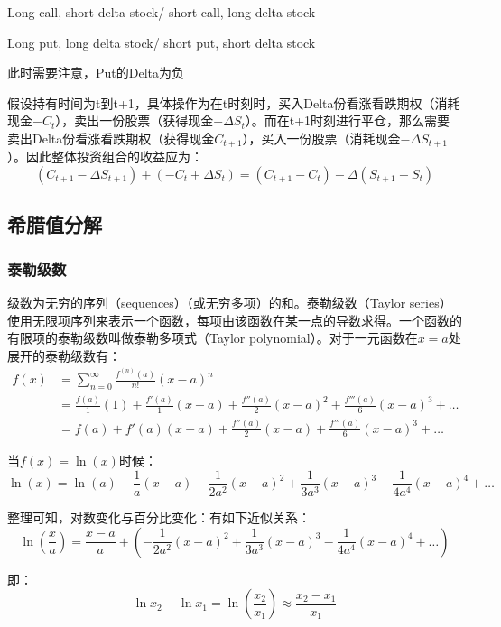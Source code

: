\documentclass[11pt]{article}
\begin{document}
Long call, short delta stock/ short call, long delta stock

Long put, long delta stock/ short put, short delta stock

此时需要注意，Put的Delta为负

假设持有时间为t到t+1，具体操作为在t时刻时，买入Delta份看涨看跌期权（消耗现金$-C_{t}$），卖出一份股票（获得现金$+ \Delta S_{t}$）。而在t+1时刻进行平仓，那么需要卖出Delta份看涨看跌期权（获得现金$C_{t+1}$），买入一份股票（消耗现金$- \Delta S_{t+1}$）。因此整体投资组合的收益应为：
\begin{equation*}
    ( C_{t+1} -\Delta S_{t+1} ) + ( -C_{t} + \Delta S_{t} ) =  (C_{t+1} - C_{t}) - \Delta (S_{t+1} - S_{t})
\end{equation*}

\subsection{希腊值分解}

\subsubsection{泰勒级数}

级数为无穷的序列（sequences）（或无穷多项）的和。泰勒级数（Taylor series）使用无限项序列来表示一个函数，每项由该函数在某一点的导数求得。一个函数的有限项的泰勒级数叫做泰勒多项式（Taylor polynomial）。对于一元函数在$x=a$处展开的泰勒级数有：
\begin{align*}
    f(x) &= \sum^{\infty}_{n=0} \frac{f^{(n)}(a)}{n!}(x-a)^n \\
    &= \frac{f(a)}{1}(1)+ \frac{f'(a)}{1}(x-a) + \frac{f''(a)}{2}(x-a)^2 + \frac{f'''(a)}{6}(x-a)^3 + \dots \\
    &= f(a) + f'(a)(x-a) + \frac{f''(a)}{2}(x-a) + \frac{f'''(a)}{6}(x-a)^3 + \dots
\end{align*}

\begin{example}
    当$f(x) = \ln(x)$时候：
    \begin{equation*}
        \ln(x) = \ln(a) + \frac{1}{a}(x-a) - \frac{1}{2a^2}(x-a)^2 + \frac{1}{3a^3}(x-a)^3 - \frac{1}{4a^4}(x-a)^4 + \dots
    \end{equation*}

    整理可知，对数变化与百分比变化：有如下近似关系：
    \begin{equation*}
        \ln\left(\frac{x}{a}\right) = \frac{x-a}{a} + \left( - \frac{1}{2a^2}(x-a)^2 + \frac{1}{3a^3}(x-a)^3 - \frac{1}{4a^4}(x-a)^4 + \dots \right)
    \end{equation*}

    即：
    \begin{equation*}
        \ln x_2 - \ln x_1 = \ln\left(\frac{x_2}{x_1}\right) \approx \frac{x_2-x_1}{x_1}
    \end{equation*}
\end{example}
\end{document}

